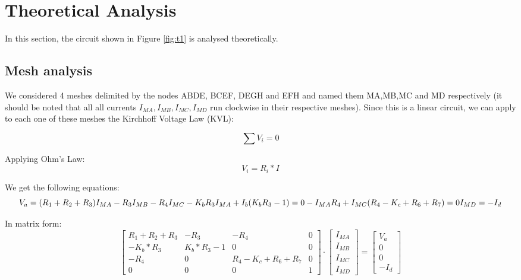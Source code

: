 \section{Theoretical Analysis}
\label{sec:analysis}

In this section, the circuit shown in Figure \ref{fig:t1} is analysed
theoretically.

\subsection{Mesh analysis}
We considered 4 meshes delimited by the nodes ABDE, BCEF, DEGH and EFH and named them MA,MB,MC and MD respectively
(it should be noted that all all currents $I_{MA}, I_{MB}, I_{MC}, I_{MD}$ run clockwise in their respective meshes).
Since this is a linear circuit, we can apply to each one of these meshes the Kirchhoff Voltage Law (KVL):


\begin{equation}
  \sum V_i = 0
  \label{eq:KVL}
\end{equation}

Applying Ohm's Law:
\begin{equation}
  V_i= R_i * I
  \label{eq:OhmLaw}
\end{equation}

We get the following equations:
\begin{equation}
    
     V_a = (R_1+R_2+R_3)I_{MA} - R_3I_{MB} - R_4I_{MC}\\
  
    -K_bR_3I_{MA} + I_b(K_bR_3-1)=0\\
  
    -I_{MA}R_4 + I_{MC}(R_4-K_c+R_6+R_7)=0\\
   
    I_{MD}= -I_d

  \label{eq:malhas}
\end{equation}

In matrix form:
  \begin{equation}\label{eq:matrixeqn}
\begin{bmatrix}
R_1+R_2+R_3 & -R_3 & -R_4 & 0 \\

-K_b*R_3 & K_b* R_3-1 & 0 & 0 \\

-R_4 & 0 & R_4-K_c+R_6+R_7 & 0 \\

0 & 0 & 0 & 1 
\end{bmatrix}
\cdot
\begin{bmatrix}
I_{MA} \\
I_{MB} \\
I_{MC} \\
I_{MD} 
    \end{bmatrix}
=
    \begin{bmatrix}
V_a \\
0 \\
0 \\
-I_d
    \end{bmatrix}
  \end{equation}

